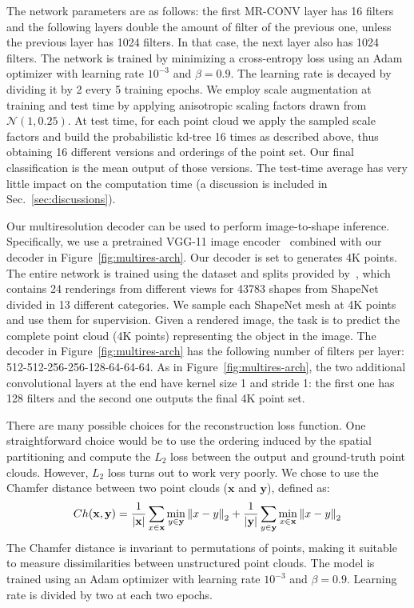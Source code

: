 The network parameters are as follows: the first MR-CONV layer has 16 filters and the following layers double the amount of filter of the previous one, unless the previous layer has 1024 filters. In that case, the next layer also has 1024 filters. The network is trained by minimizing a cross-entropy loss using an Adam optimizer with learning rate $10^{-3}$ and $\beta = 0.9$. The learning rate is decayed by dividing it by 2 every 5 training epochs. We employ scale augmentation at training and test time by applying anisotropic scaling factors drawn from $\mathcal{N}(1, 0.25)$.
At test time, for each point cloud we apply the sampled scale factors and build the probabilistic kd-tree 16 times as described above, thus obtaining 16 different versions and orderings of the point set.
Our final classification is the mean output of those versions. The test-time average has very little impact on the computation time (a discussion is included in Sec.~\ref{sec:discussions}). 


 Our multiresolution decoder can be used to perform image-to-shape inference. 
Specifically, we use a pretrained VGG-11 image encoder~\cite{vgg} combined with our decoder in Figure~\ref{fig:multires-arch}. 
Our decoder is set to generates 4K points. 
The entire network is trained using the dataset and splits provided by~\cite{choy20163d}, 
which contains 24 renderings from different views for 43783 shapes from ShapeNet divided in 13 different categories. 
We sample each ShapeNet mesh at 4K points and use them for supervision.
Given a rendered image, the task is to predict the complete point cloud (4K points) representing the object in the image.
The decoder in Figure~\ref{fig:multires-arch} has the following number of filters per layer:
512-512-256-256-128-64-64-64. As in Figure~\ref{fig:multires-arch}, the two additional
convolutional layers at the end have kernel size 1 and stride 1: the first one has 128 filters and the second one outputs the final 4K point set.

There are many possible choices for the reconstruction loss function. One straightforward choice would be to use the ordering induced by the spatial partitioning and compute the $L_2$ loss between the output and ground-truth point clouds. However, $L_2$ loss turns out to work very poorly. 
We chose to use the Chamfer distance between two point clouds ($\mathbf{x}$ and $\mathbf{y}$), defined as:
\begin{equation}
	Ch(\mathbf{x}, \mathbf{y})=
		 \frac{1}{|\mathbf{x}|}\sum_{x \in \mathbf{x}} \min_{y \in \mathbf{y}} \left\lVert x-y\right\rVert_2 +
		 \frac{1}{|\mathbf{y}|}\sum_{y \in \mathbf{y}} \min_{x \in \mathbf{x}} \left\lVert x-y\right\rVert_2 \nonumber
\end{equation}
The Chamfer distance is invariant to permutations of points, making it suitable to measure dissimilarities between unstructured point clouds.
The model is trained using an Adam optimizer with learning rate $10^{-3}$ and $\beta = 0.9$.
Learning rate is divided by two at each two epochs.

